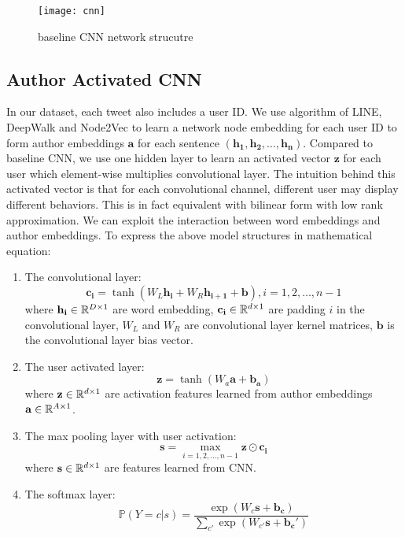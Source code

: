 \begin{figure}[h]
\centering
\begin{minipage}{.5\textwidth}
  \centering
  \texttt{[image: cnn]}
    \label{fig:cnn}
\end{minipage}%
\caption{baseline CNN network strucutre}
\end{figure}

\subsection*{Author Activated CNN}
In our dataset, each tweet also includes a user ID. We use algorithm of LINE, DeepWalk and Node2Vec to learn a network node embedding for each user ID to form author embeddings $\mathbf{a}$ for each sentence $(\mathbf{h_1},\mathbf{h_2},\ldots,\mathbf{h_n})$. Compared to baseline CNN, we use one hidden layer to learn an activated vector $\mathbf{z}$ for each user which element-wise multiplies convolutional layer. The intuition behind this activated vector is that for each convolutional channel, different user may display different behaviors. This is in fact equivalent with bilinear form with low rank approximation. We can exploit the interaction between word embeddings and author embeddings. To express the above model structures in mathematical equation:
\begin{enumerate}
	\item The convolutional layer:
\begin{equation}
	\mathbf{c_i} = \tanh(W_L\mathbf{h_i} + W_R \mathbf{h_{i+1}} + \mathbf{b}), i=1,2,\ldots,n-1
\end{equation}
where $\mathbf{h_i}\in \mathbb{R}^{D\times1}$ are word embedding, $\mathbf{c_i} \in \mathbb{R}^{d\times1}$ are padding $i$ in the convolutional layer, $W_L$ and $W_R$ are convolutional layer kernel matrices, $\mathbf{b}$ is the convolutional layer bias vector.
\item The user activated layer:
\begin{equation}
	\mathbf{z} = \tanh(W_a\mathbf{a}  + \mathbf{b_a})
\end{equation}
where $\mathbf{z} \in \mathbb{R}^{d \times 1}$ are activation features learned from author embeddings $\mathbf{a} \in \mathbb{R}^{A\times1}$.
\item The max pooling layer with user activation:
\begin{equation}
	\mathbf{s} = \max_{i=1,2,\ldots,n-1}\mathbf{z}\odot\mathbf{c_i}
\end{equation}
where $\mathbf{s} \in \mathbb{R}^{d \times 1}$ are features learned from CNN.
\item The softmax layer:
\begin{equation}
	\mathbb{P}(Y=c|s)=\frac{\exp(W_{c}\mathbf{s}+\mathbf{b_c})}{\sum_{c'}\exp(W_{c'}\mathbf{s}+\mathbf{b_c'})}
\end{equation}
\end{enumerate}
